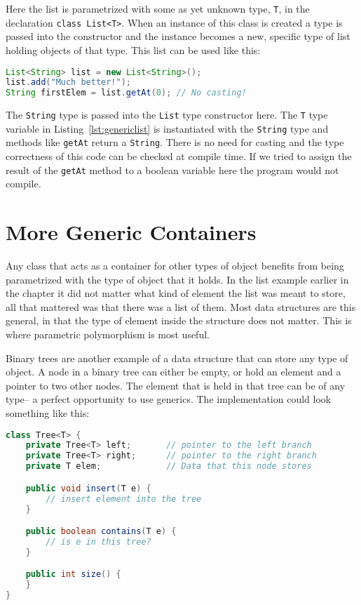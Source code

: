 Here the list is parametrized with some as yet unknown type, \lstinline{T}, in
the declaration \lstinline{class List<T>}. When an instance of this class is
created a type is passed into the constructor and the instance becomes a new,
specific type of list holding objects of that type. This list can be used like
this:

\begin{lstlisting}[nolol, language=Java, label={lst:listuse}]
List<String> list = new List<String>();
list.add("Much better!");
String firstElem = list.getAt(0); // No casting!
\end{lstlisting}

The \lstinline{String} type is passed into the \lstinline{List} type
constructor here. The \lstinline{T} type variable in
Listing~\ref{lst:genericlist} is instantiated with the \lstinline{String} type
and methods like \lstinline{getAt} return a \lstinline{String}. There is no
need for casting and the type correctness of this code can be checked at
compile time. If we tried to assign the result of the \lstinline{getAt} method
to a boolean variable here the program would not compile.

\section{More Generic Containers}
Any class that acts as a container for other types of object benefits from
being parametrized with the type of object that it holds. In the list example
earlier in the chapter it did not matter what kind of element the list was
meant to store, all that mattered was that there was a list of them. Most data
structures are this general, in that the type of element inside the structure
does not matter. This is where parametric polymorphism is most useful.

Binary trees are another example of a data structure that can store any type of
object. A node in a binary tree can either be empty, or hold an element and a
pointer to two other nodes. The element that is held in that tree can be of any
type-- a perfect opportunity to use generics. The implementation could look
something like this:

\begin{lstlisting}[caption={Binary tree with generics}, language=Java, label={lst:generictree}]
class Tree<T> {
    private Tree<T> left;       // pointer to the left branch
    private Tree<T> right;      // pointer to the right branch
    private T elem;             // Data that this node stores

    public void insert(T e) {
        // insert element into the tree
    }

    public boolean contains(T e) {
        // is e in this tree?
    }

    public int size() {
    }
}
\end{lstlisting}

